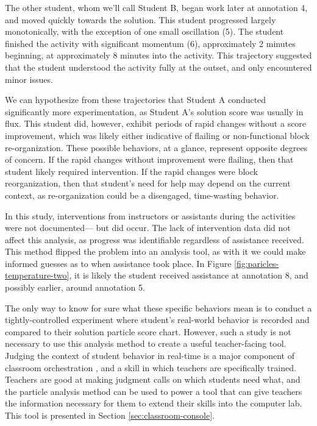 The other student, whom we'll call Student B, began work later at annotation 4, and moved quickly towards the solution. This student progressed largely monotonically, with the exception of one small oscillation (5). The student finished the activity with significant momentum (6), approximately 2 minutes beginning, at approximately 8 minutes into the activity. This trajectory suggested that the student understood the activity fully at the outset, and only encountered minor issues. 

We can hypothesize from these trajectories that Student A conducted significantly more experimentation, as Student A's solution score was usually in flux. This student did, however, exhibit periods of rapid changes without a score improvement, which was likely either indicative of flailing or non-functional block re-organization. These possible behaviors, at a glance, represent opposite degrees of concern. If the rapid changes without improvement were flailing, then that student likely required intervention. If the rapid changes were block reorganization, then that student's need for help may depend on the current context, as re-organization could be a disengaged, time-wasting behavior. %

In this study, interventions from instructors or assistants during the activities were not documented--- but did occur. The lack of intervention data did not affect this analysis, as progress was identifiable regardless of assistance received. This method flipped the problem into an analysis tool, as with it we could make informed guesses as to when assistance took place. In Figure \ref{fig:paricles-temperature-two}, it is likely the student received assistance at annotation 8, and possibly earlier, around annotation 5. 

The only way to know for sure what these specific behaviors mean is to conduct a tightly-controlled experiment where student's real-world behavior is recorded and compared to their solution particle score chart. However, such a study is not necessary to use this analysis method to create a useful teacher-facing tool. Judging the context of student behavior in real-time is a major component of classroom orchestration \citep{dillenbourg2012design}, and a skill in which teachers are specifically trained. Teachers are good at making judgment calls on which students need what, and the particle analysis method can be used to power a tool that can give teachers the information necessary for them to extend their skills into the computer lab. This tool is presented in Section \ref{sec:classroom-console}.


